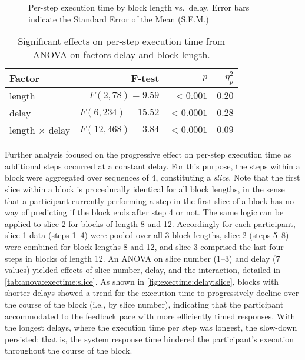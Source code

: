 \documentclass[10pt,letterpaper]{article}
\providecommand{\DIFaddend}{\protect\color{black}} %
\DeclareRobustCommand{\DIFaddend}{\DIFOaddend \let\includegraphics\DIFOincludegraphics} %
\begin{document}
\DIFaddend \begin{figure}[h]
    \centering
    \caption{Per-step execution time by block length vs.\ delay. Error bars indicate the Standard Error of the Mean (S.E.M.)}\label{fig:exectime}%
\end{figure}

\begin{table}[h]
  \centering
  \caption{Significant effects on per-step execution time from ANOVA on factors delay and block length.}\label{tab:anova:exectime}
  \setlength{\tabcolsep}{0pt}%
  \begin{tabular*}{\columnwidth}{@{\extracolsep{\fill}\quad}lrrr@{}}
    \toprule
    \textbf{Factor} & \textbf{F-test} & \( p \) & \( \eta^{2}_{p} \) \\
    \midrule
    length         &    \(F(2, 78) = 9.59\) &   \(< 0.001\) &           \(0.20\) \\
    delay          &  \(F(6, 234) = 15.52\) &  \(< 0.0001\) &           \(0.28\) \\
    length \(\times\) delay &  \(F(12, 468) = 3.84\) &  \(< 0.0001\) &           \(0.09\) \\
    \bottomrule
  \end{tabular*}
\end{table}

Further analysis focused on the progressive effect on per-step execution time as additional steps occurred at a constant delay.
For this purpose, the steps within a block were aggregated over sequences of 4, constituting a \emph{slice}.
Note that the first slice within a block is procedurally identical for all block lengths, in the sense that a participant currently performing a step in the first slice of a block has no way of predicting if the block ends after step 4 or not.
The same logic can be applied to slice 2 for blocks of length 8 and 12.
Accordingly for each participant, slice 1 data (steps 1--4) were pooled over all 3 block lengths, slice 2 (steps 5--8) were combined for block lengths 8 and 12, and slice 3 comprised the last four steps in blocks of length 12.
An ANOVA on slice number (1--3) and delay (7 values) yielded effects of slice number, delay, and the interaction, detailed in \cref{tab:anova:exectime:slice}.
As shown in \cref{fig:exectime:delay:slice}, blocks with shorter delays showed a trend for the execution time to progressively decline over the course of the block (i.e., by slice number), indicating that the participant accommodated to the feedback pace with more efficiently timed responses.
With the longest delays, where the execution time per step was longest, the slow-down persisted; that is, the system response time hindered the participant's execution throughout the course of the block.
\end{document}
